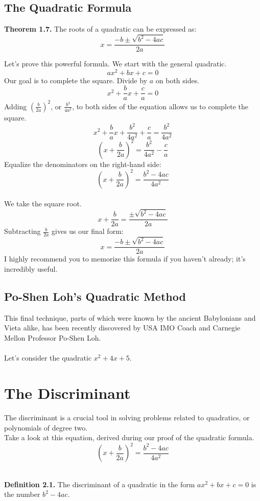 \documentclass{article}
\begin{document}
\subsection{The Quadratic Formula}
\begin{mdframed}
  \textbf{Theorem 1.7.} The roots of a quadratic can be expressed as: $$x=\frac{-b\pm\sqrt{b^2-4ac}}{2a}$$
\end{mdframed}
Let's prove this powerful formula. We start with the general quadratic. $$ax^2+bx+c=0$$
Our goal is to complete the square. Divide by $a$ on both sides.
$$x^2+\frac{b}{a}x+\frac{c}{a}=0$$
Adding $(\frac{b}{2a})^2$, or $\frac{b^2}{4a^2}$, to both sides of the equation allows us to complete the square.
$$x^2+\frac{b}{a}x+\frac{b^2}{4a^2}+\frac{c}{a}=\frac{b^2}{4a^2}$$
$$(x+\frac{b}{2a})^2=\frac{b^2}{4a^2}-\frac{c}{a}$$
Equalize the denominators on the right-hand side:
$$(x+\frac{b}{2a})^2=\frac{b^2-4ac}{4a^2}$$\\
We take the square root.
$$x+\frac{b}{2a}=\frac{\pm\sqrt{b^2-4ac}}{2a}$$
Subtracting $\frac{b}{2a}$ gives us our final form:
$$x=\frac{-b\pm\sqrt{b^2-4ac}}{2a}$$
I highly recommend you to memorize this formula if you haven't already; it's incredibly useful.

\subsection{Po-Shen Loh's Quadratic Method}
This final technique, parts of which were known by the ancient Babylonians and Vieta alike, has been recently discovered by USA IMO Coach and Carnegie Mellon Professor Po-Shen Loh.
\\\\Let's consider the quadratic $x^2+4x+5$. 


\section{The Discriminant}
The discriminant is a crucial tool in solving problems related to quadratics, or polynomials of degree two.\\

Take a look at this equation, derived during our proof of the quadratic formula.
$$(x+\frac{b}{2a})^2=\frac{b^2-4ac}{4a^2}$$\\

\begin{mdframed}
  \textbf{Definition 2.1.} The discriminant of a quadratic in the form $ax^2+bx+c=0$ is the number $b^2-4ac$.
\end{mdframed}
\end{document}
